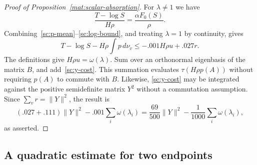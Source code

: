 \documentclass[11pt]{article}
\theoremstyle{definition}
\theoremstyle{remark}
\numberwithin{equation}{section}
\begin{document}
\begin{proof}[Proof of Proposition~\ref{mat:scalar-absorption}]
For $\lambda\ne1$ we have
\[
 \frac{T-\log S}{H\rho}=\frac{\alpha F_0(S)}{\rho}.
\]
Combining~\eqref{sc:p-mean}--\eqref{sc:log-bound}, and treating $\lambda=1$
by continuity, gives
\[
 T-\log S-H\rho\int p\,d\nu_v
       \le -.001H\rho u+.027r.
\]
The definitions give $H\rho u=\omega(\lambda)$.  Sum over an orthonormal
eigenbasis of the matrix $B$, and add~\eqref{sc:y-cost}.
This summation evaluates $\tau(H\rho p(A))$ without requiring $p(A)$
to commute with $B$.  Likewise, \eqref{sc:y-cost} may be integrated
against the positive semidefinite matrix $Y^2$ without a commutation
assumption.  Since $\sum_v r=\lVert Y\rVert^2$, the result is
\[
 (.027+.111)\lVert Y\rVert^2-.001\sum_i\omega(\lambda_i)
 =\frac{69}{500}\lVert Y\rVert^2-\frac1{1000}\sum_i\omega(\lambda_i),
\]
as asserted.
\end{proof}

\subsection{A quadratic estimate for two endpoints}\label{sc:pair-proof}
\end{document}
